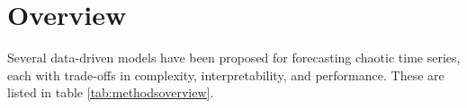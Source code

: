 \documentclass[%
 reprint,
 amsmath,amssymb,
 aps,
]{revtex4-2}
\begin{document}

\section{\label{sec:overview}Overview} %

Several data-driven models have been proposed for forecasting chaotic time series, each with trade-offs in complexity, interpretability, and performance. These are listed in table \ref{tab:methodsoverview}.
\end{document}
